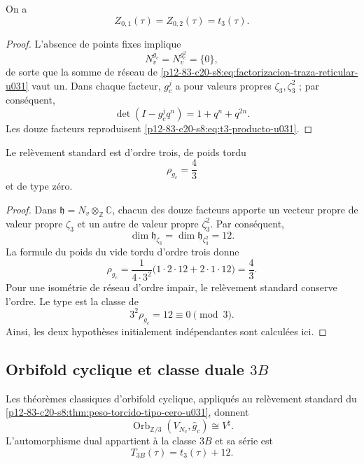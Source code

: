 \begin{proposition}
\label{p12-83-c20-s8:prop:traza-reticular-t3-u031}
On a
\[
 Z_{0,1}(\tau)=Z_{0,2}(\tau)=t_3(\tau).
\]
\end{proposition}

\begin{proof}
L'absence de points fixes implique
\[
 N_v^{g_c}=N_v^{g_c^2}=\{0\},
\]
de sorte que la somme de réseau de
\eqref{p12-83-c20-s8:eq:factorizacion-traza-reticular-u031} vaut un. Dans chaque facteur,
\(g_c^j\) a pour valeurs propres \(\zeta_3,\zeta_3^2\) ; par conséquent,
\[
 \det(I-g_c^jq^n)=1+q^n+q^{2n}.
\]
Les douze facteurs reproduisent \eqref{p12-83-c20-s8:eq:t3-producto-u031}.
\end{proof}

\begin{theorem}
\label{p12-83-c20-s8:thm:peso-torcido-tipo-cero-u031}
Le relèvement standard est d'ordre trois, de poids tordu
\begin{equation}
 \rho_{g_c}=\frac43
 \label{p12-83-c20-s8:eq:peso-torcido-u031}
\end{equation}
et de type zéro.
\end{theorem}

\begin{proof}
Dans
\(\mathfrak h=N_v\otimes_{\mathbb Z}\mathbb C\), chacun des douze
facteurs apporte un vecteur propre de valeur propre \(\zeta_3\) et un autre de valeur propre
\(\zeta_3^2\). Par conséquent,
\[
 \dim\mathfrak h_{\zeta_3}
 =\dim\mathfrak h_{\zeta_3^2}=12.
\]
La formule du poids du vide tordu d'ordre trois donne
\[
 \rho_{g_c}
 =\frac1{4\cdot3^2}
 \bigl(1\cdot2\cdot12+2\cdot1\cdot12\bigr)
 =\frac43.
\]
Pour une isométrie de réseau d'ordre impair, le relèvement standard conserve
l'ordre. Le type est la classe de
\[
 3^2\rho_{g_c}=12\equiv0\pmod3.
\]
Ainsi, les deux hypothèses initialement indépendantes sont calculées ici.
\end{proof}

\subsection{Orbifold cyclique et classe duale \texorpdfstring{\(3B\)}{3B}}

\begin{theorem}
\label{p12-83-c20-s8:thm:orbifold-triadico-vnatural-u031}
Les théorèmes classiques d'orbifold cyclique, appliqués au relèvement standard
du \cref{p12-83-c20-s8:thm:peso-torcido-tipo-cero-u031}, donnent
\begin{equation}
 \operatorname{Orb}_{\mathbb Z/3}
 (V_{N_v},\widehat g_c)
 \cong V^\natural.
 \label{p12-83-c20-s8:eq:orbifold-triadico-vnatural-u031}
\end{equation}
L'automorphisme dual appartient à la classe \(3B\) et sa série est
\begin{equation}
 T_{3B}(\tau)=t_3(\tau)+12.
 \label{p12-83-c20-s8:eq:serie-3b-u031}
\end{equation}
\end{theorem}


